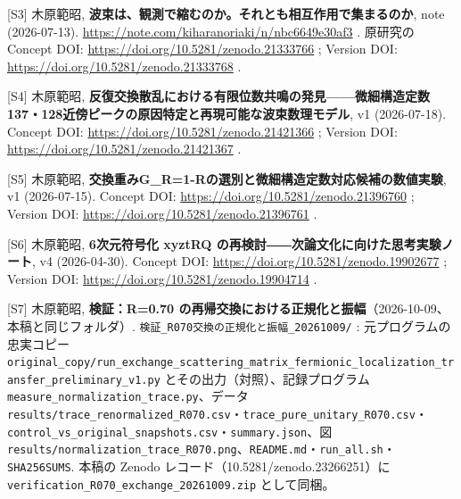 \documentclass[
  a4paper,
]{ltjsarticle}
\begin{document}
{[}S3{]} 木原範昭,
\textbf{波束は、観測で縮むのか。それとも相互作用で集まるのか}, note
(2026-07-13). \url{https://note.com/kiharanoriaki/n/nbc6649e30af3} . 原研究の
Concept DOI: \url{https://doi.org/10.5281/zenodo.21333766} ; Version DOI:
\url{https://doi.org/10.5281/zenodo.21333768} .

{[}S4{]} 木原範昭,
\textbf{反復交換散乱における有限位数共鳴の発見------微細構造定数137・128近傍ピークの原因特定と再現可能な波束数理モデル},
v1 (2026-07-18). Concept DOI: \url{https://doi.org/10.5281/zenodo.21421366} ;
Version DOI: \url{https://doi.org/10.5281/zenodo.21421367} .

{[}S5{]} 木原範昭,
\textbf{交換重みG\_R=1-Rの選別と微細構造定数対応候補の数値実験}, v1
(2026-07-15). Concept DOI: \url{https://doi.org/10.5281/zenodo.21396760} ;
Version DOI: \url{https://doi.org/10.5281/zenodo.21396761} .

{[}S6{]} 木原範昭, \textbf{6次元符号化 xyztRQ
の再検討――次論文化に向けた思考実験ノート}, v4 (2026-04-30). Concept DOI:
\url{https://doi.org/10.5281/zenodo.19902677} ; Version DOI:
\url{https://doi.org/10.5281/zenodo.19904714} .

{[}S7{]} 木原範昭, \textbf{検証：R=0.70
の再帰交換における正規化と振幅}（2026-10-09、本稿と同じフォルダ）.
\texttt{検証\_\allowbreak{}R070交換の正規化と振幅\_\allowbreak{}20261009/\allowbreak{}} :
元プログラムの忠実コピー
\texttt{original\_\allowbreak{}copy/\allowbreak{}run\_\allowbreak{}exchange\_\allowbreak{}scattering\_\allowbreak{}matrix\_\allowbreak{}fermionic\_\allowbreak{}localization\_\allowbreak{}transfer\_\allowbreak{}preliminary\_\allowbreak{}v1.py}
とその出力（対照）、記録プログラム
\texttt{measure\_\allowbreak{}normalization\_\allowbreak{}trace.py}、データ
\texttt{results/\allowbreak{}trace\_\allowbreak{}renormalized\_\allowbreak{}R070.csv}・\texttt{trace\_\allowbreak{}pure\_\allowbreak{}unitary\_\allowbreak{}R070.csv}・\texttt{control\_\allowbreak{}vs\_\allowbreak{}original\_\allowbreak{}snapshots.csv}・\texttt{summary.json}、図
\texttt{results/\allowbreak{}normalization\_\allowbreak{}trace\_\allowbreak{}R070.png}、\texttt{README.md}・\texttt{run\_\allowbreak{}all.sh}・\texttt{SHA256SUMS}.
本稿の Zenodo レコード（10.5281/zenodo.23266251）に
\texttt{verification\_\allowbreak{}R070\_\allowbreak{}exchange\_\allowbreak{}20261009.zip} として同梱。
\end{document}

